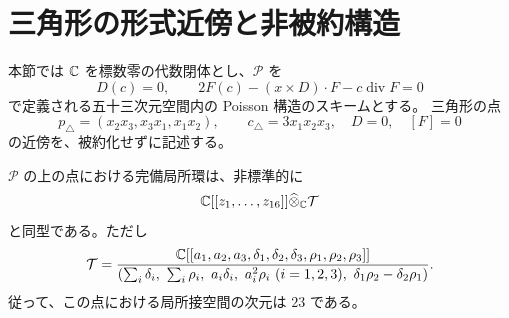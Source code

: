 \section{三角形の形式近傍と非被約構造}
\label{sec:triangle-local-v32}

本節では $\mathbb C$ を標数零の代数閉体とし、$\mathscr P$ を
\[
 D(c)=0,\qquad 2F(c)-(x\times D)\cdot F-c\operatorname{div}F=0
\]
で定義される五十三次元空間内の Poisson 構造のスキームとする。
三角形の点
\[
 p_\triangle=(x_2x_3,x_3x_1,x_1x_2),\qquad
 c_\triangle=3x_1x_2x_3,\quad D=0,\quad [F]=0
\]
の近傍を、被約化せずに記述する。

\begin{theorem}[三角形の完備局所環]
\label{thm:triangle-local-v32}
$\mathscr P$ の上の点における完備局所環は、非標準的に
\[
 \mathbb C[[z_1,\ldots,z_{16}]]\widehat\otimes_\mathbb C \mathcal T
\]
と同型である。ただし
\[
 \mathcal T=
 \frac{\mathbb C[[a_1,a_2,a_3,\delta_1,\delta_2,\delta_3,
                   \rho_1,\rho_2,\rho_3]]}
 {\left(
  \sum_i\delta_i,\ \sum_i\rho_i,\
  a_i\delta_i,\ a_i^2\rho_i\ (i=1,2,3),\
  \delta_1\rho_2-\delta_2\rho_1
 \right)}.
\]
従って、この点における局所接空間の次元は $23$ である。
\end{theorem}

